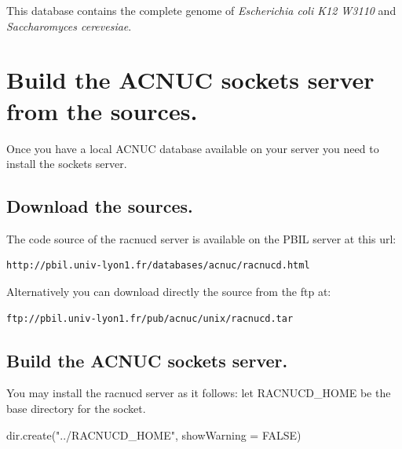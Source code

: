 \documentclass{article}
\begin{document}
This database contains the complete genome of \textit{Escherichia coli K12 W3110} and
\textit{Saccharomyces cerevesiae}.

\section{Build the ACNUC sockets server from the sources.}

Once you have a local  ACNUC database available on your server you need to install the sockets server.

\subsection{Download the sources.}
The code source of the racnucd server is available on the PBIL server  at this url:
\begin{verbatim}
http://pbil.univ-lyon1.fr/databases/acnuc/racnucd.html
\end{verbatim}
Alternatively you can download directly  the source from the ftp at:
\begin{verbatim}
ftp://pbil.univ-lyon1.fr/pub/acnuc/unix/racnucd.tar
\end{verbatim}

\subsection{Build the ACNUC sockets server.}
You may install the racnucd server as it follows:
let RACNUCD\_HOME be the base directory for the socket.

\begin{Schunk}
\begin{Sinput}
 dir.create("../RACNUCD_HOME", showWarning = FALSE)
\end{Sinput}
\end{Schunk}
\end{document}
